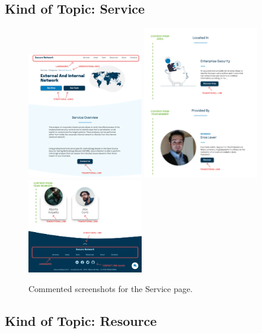 \documentclass[12pt]{report}
\begin{document}
\subsection{Kind of Topic: Service}

\begin{figure}[H]
	\centering
	\includegraphics[width=0.45\textwidth]{high_fid_wireframes/service/1.png}
	\includegraphics[width=0.45\textwidth]{high_fid_wireframes/service/2.png}
	\includegraphics[width=0.45\textwidth]{high_fid_wireframes/service/3.png}
	\caption{Commented screenshots for the Service page.}
\end{figure}

\subsection{Kind of Topic: Resource}
\end{document}

